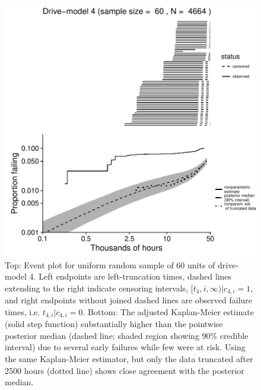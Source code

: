 \documentclass[12pt]{article}
\begin{document}
\begin{figure}
\centering
\includegraphics{dm4-exception}
\caption{Top: Event plot for uniform random sample of 60 units of drive-model 4. Left endpoints are left-truncation times, dashed lines extending to the right indicate censoring intervals, $[t_4,i, \infty)|c_{4,i}=1$, and right endpoints without joined dashed lines are observed failure times, i.e. $t_{4,i}|c_{4,i}=0$. Bottom: The adjusted Kaplan-Meier estimate (solid step function) substantially higher than the pointwise posterior median (dashed line; shaded region showing 90\% credible interval) due to several early failures while few were at risk.  Using the same Kaplan-Meier estimator, but only the data truncated after 2500 hours (dotted line) shows close agreement with the posterior median.}

\label{fig:ex-mod-4}
\end{figure}
\end{document}

